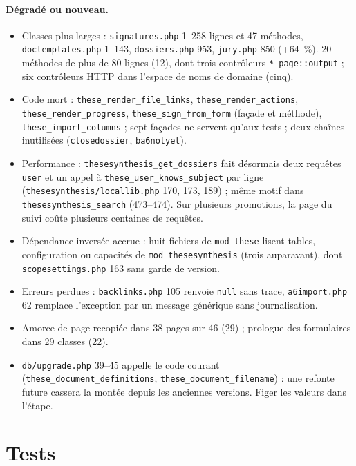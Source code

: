 \documentclass[11pt,a4paper]{article}
\newcommand{\fichier}[1]{\texttt{\small #1}}
\newcommand{\code}[1]{\texttt{#1}}
\begin{document}
\paragraph{Dégradé ou nouveau.}
\begin{itemize}
  \item Classes plus larges : \fichier{signatures.php} 1~258 lignes et 47 méthodes,
    \fichier{doctemplates.php} 1~143, \fichier{dossiers.php} 953, \fichier{jury.php} 850 (+64~\%).
    20 méthodes de plus de 80 lignes (12), dont trois contrôleurs \code{*\_page::output} ; six
    contrôleurs HTTP dans l'espace de noms de domaine (cinq).
  \item Code mort : \code{these\_render\_file\_links}, \code{these\_render\_actions},
    \code{these\_render\_progress}, \code{these\_sign\_from\_form} (façade et méthode),
    \code{these\_import\_columns} ; sept façades ne servent qu'aux tests ; deux chaînes inutilisées
    (\code{closedossier}, \code{ba6notyet}).
  \item Performance : \code{thesesynthesis\_get\_dossiers} fait désormais deux requêtes
    \code{user} et un appel à \code{these\_user\_knows\_subject} par ligne
    (\fichier{thesesynthesis/locallib.php} 170, 173, 189) ; même motif dans
    \code{thesesynthesis\_search} (473--474). Sur plusieurs promotions, la page du suivi coûte
    plusieurs centaines de requêtes.
  \item Dépendance inversée accrue : huit fichiers de \code{mod\_these} lisent tables,
    configuration ou capacités de \code{mod\_thesesynthesis} (trois auparavant), dont
    \fichier{scopesettings.php} 163 sans garde de version.
  \item Erreurs perdues : \fichier{backlinks.php} 105 renvoie \code{null} sans trace,
    \fichier{a6import.php} 62 remplace l'exception par un message générique sans journalisation.
  \item Amorce de page recopiée dans 38 pages sur 46 (29) ; prologue des formulaires dans 29
    classes (22).
  \item \fichier{db/upgrade.php} 39--45 appelle le code courant (\code{these\_document\_definitions},
    \code{these\_document\_filename}) : une refonte future cassera la montée depuis les anciennes
    versions. Figer les valeurs dans l'étape.
\end{itemize}

\section{Tests}
\end{document}
